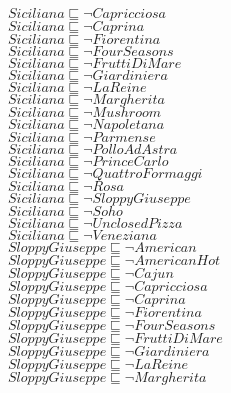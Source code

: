 \documentclass[a4paper,10pt]{article}
\begin{document}
 $Siciliana \sqsubseteq  \lnot Capricciosa$\\ 
 $Siciliana \sqsubseteq  \lnot Caprina$\\ 
 $Siciliana \sqsubseteq  \lnot Fiorentina$\\ 
 $Siciliana \sqsubseteq  \lnot FourSeasons$\\ 
 $Siciliana \sqsubseteq  \lnot FruttiDiMare$\\ 
 $Siciliana \sqsubseteq  \lnot Giardiniera$\\ 
 $Siciliana \sqsubseteq  \lnot LaReine$\\ 
 $Siciliana \sqsubseteq  \lnot Margherita$\\ 
 $Siciliana \sqsubseteq  \lnot Mushroom$\\ 
 $Siciliana \sqsubseteq  \lnot Napoletana$\\ 
 $Siciliana \sqsubseteq  \lnot Parmense$\\ 
 $Siciliana \sqsubseteq  \lnot PolloAdAstra$\\ 
 $Siciliana \sqsubseteq  \lnot PrinceCarlo$\\ 
 $Siciliana \sqsubseteq  \lnot QuattroFormaggi$\\ 
 $Siciliana \sqsubseteq  \lnot Rosa$\\ 
 $Siciliana \sqsubseteq  \lnot SloppyGiuseppe$\\ 
 $Siciliana \sqsubseteq  \lnot Soho$\\ 
 $Siciliana \sqsubseteq  \lnot UnclosedPizza$\\ 
 $Siciliana \sqsubseteq  \lnot Veneziana$\\ 
 $SloppyGiuseppe \sqsubseteq  \lnot American$\\ 
 $SloppyGiuseppe \sqsubseteq  \lnot AmericanHot$\\ 
 $SloppyGiuseppe \sqsubseteq  \lnot Cajun$\\ 
 $SloppyGiuseppe \sqsubseteq  \lnot Capricciosa$\\ 
 $SloppyGiuseppe \sqsubseteq  \lnot Caprina$\\ 
 $SloppyGiuseppe \sqsubseteq  \lnot Fiorentina$\\ 
 $SloppyGiuseppe \sqsubseteq  \lnot FourSeasons$\\ 
 $SloppyGiuseppe \sqsubseteq  \lnot FruttiDiMare$\\ 
 $SloppyGiuseppe \sqsubseteq  \lnot Giardiniera$\\ 
 $SloppyGiuseppe \sqsubseteq  \lnot LaReine$\\ 
 $SloppyGiuseppe \sqsubseteq  \lnot Margherita$\\ 
\end{document}
